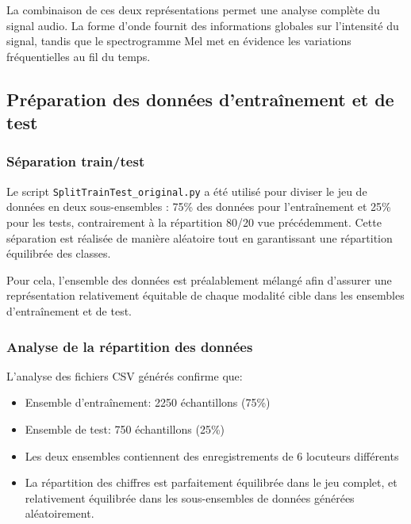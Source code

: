 La combinaison de ces deux représentations permet une analyse complète du signal audio. La forme d’onde fournit des informations globales sur l’intensité du signal, tandis que le spectrogramme Mel met en évidence les variations fréquentielles au fil du temps.

\subsection{Préparation des données d'entraînement et de test}
\label{sec:preparation}

\subsubsection{Séparation train/test}
\label{subsec:split}

Le script \texttt{SplitTrainTest\_original.py} a été utilisé pour diviser le jeu de données en deux sous-ensembles : 75\% des données pour l'entraînement et 25\% pour les tests, contrairement à la répartition 80/20 vue précédemment. Cette séparation est réalisée de manière aléatoire tout en garantissant une répartition équilibrée des classes. 

Pour cela, l'ensemble des données est préalablement mélangé afin d'assurer une représentation relativement équitable de chaque modalité cible dans les ensembles d'entraînement et de test.

\subsubsection{Analyse de la répartition des données}
\label{subsec:analyse_repartition}

L'analyse des fichiers CSV générés confirme que:
\begin{itemize}
    \item Ensemble d'entraînement: 2250 échantillons (75\%)
    \item Ensemble de test: 750 échantillons (25\%)
    \item Les deux ensembles contiennent des enregistrements de 6 locuteurs différents
    \item La répartition des chiffres est parfaitement équilibrée dans le jeu complet, et relativement équilibrée dans les sous-ensembles de données générées aléatoirement. 
\end{itemize}

